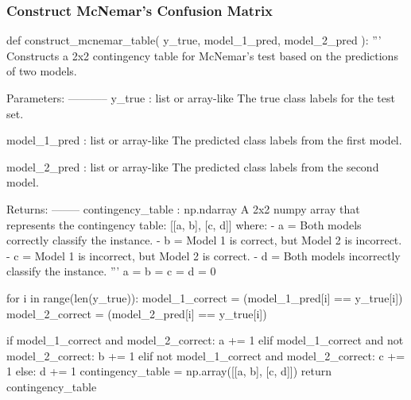 \subsubsection{Construct McNemar's Confusion Matrix}\label{appendix:mcnemar}
\begin{pythoncode}
def construct_mcnemar_table(
        y_true,
        model_1_pred,
        model_2_pred
):
    '''
    Constructs a 2x2 contingency table for McNemar's test based on the predictions of two models.

    Parameters:
    -----------
    y_true : list or array-like
        The true class labels for the test set.

    model_1_pred : list or array-like
        The predicted class labels from the first model.

    model_2_pred : list or array-like
        The predicted class labels from the second model.

    Returns:
    --------
    contingency_table : np.ndarray
        A 2x2 numpy array that represents the contingency table:
            [[a, b], [c, d]]
        where:
        - a = Both models correctly classify the instance.
        - b = Model 1 is correct, but Model 2 is incorrect.
        - c = Model 1 is incorrect, but Model 2 is correct.
        - d = Both models incorrectly classify the instance.
    '''
    a = b = c = d = 0

    for i in range(len(y_true)):
        model_1_correct = (model_1_pred[i] == y_true[i])
        model_2_correct = (model_2_pred[i] == y_true[i])

        if model_1_correct and model_2_correct:
            a += 1
        elif model_1_correct and not model_2_correct:
            b += 1
        elif not model_1_correct and model_2_correct:
            c += 1
        else:
            d += 1
    contingency_table = np.array([[a, b], [c, d]])
    return contingency_table

\end{pythoncode}
